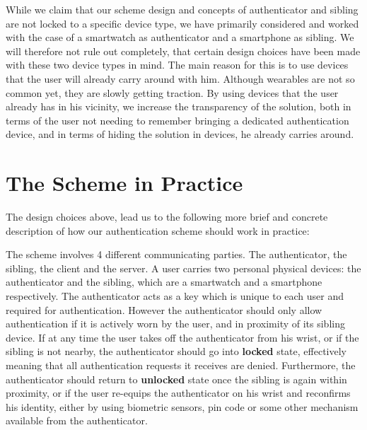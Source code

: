 While we claim that our scheme design and concepts of \gls{authenticator} and \gls{sibling} are not locked to a specific device type, we have primarily considered and worked with the case of a smartwatch as \gls{authenticator} and a smartphone as \gls{sibling}. We will therefore not rule out completely, that certain design choices have been made with these two device types in mind. The main reason for this is to use devices that the user will already carry around with him. Although wearables are not so common yet, they are slowly getting traction. By using devices that the user already has in his vicinity, we increase the transparency of the solution, both in terms of the user not needing to remember bringing a dedicated authentication device, and in terms of hiding the solution in devices, he already carries around.




\section{The Scheme in Practice} \label{sec:scheme_desc}
The design choices above, lead us to the following more brief and concrete description of how our authentication scheme should work in practice:

The scheme involves 4 different communicating parties. The \gls{authenticator}, the \gls{sibling}, the \gls{client} and the \gls{server}. A user carries two personal physical devices: the \gls{authenticator} and the \gls{sibling}, which are a smartwatch and a smartphone respectively. The \gls{authenticator} acts as a key which is unique to each user and required for authentication. However the \gls{authenticator} should only allow authentication if it is actively worn by the user, and in proximity of its \gls{sibling} device. If at any time the user takes off the \gls{authenticator} from his wrist, or if the \gls{sibling} is not nearby, the \gls{authenticator} should go into \textbf{locked} state, effectively meaning that all authentication requests it receives are denied. Furthermore, the \gls{authenticator} should return to \textbf{unlocked} state once the \gls{sibling} is again within proximity, or if the user re-equips the \gls{authenticator} on his wrist and reconfirms his identity, either by using biometric sensors, pin code or some other mechanism available from the \gls{authenticator}.  

